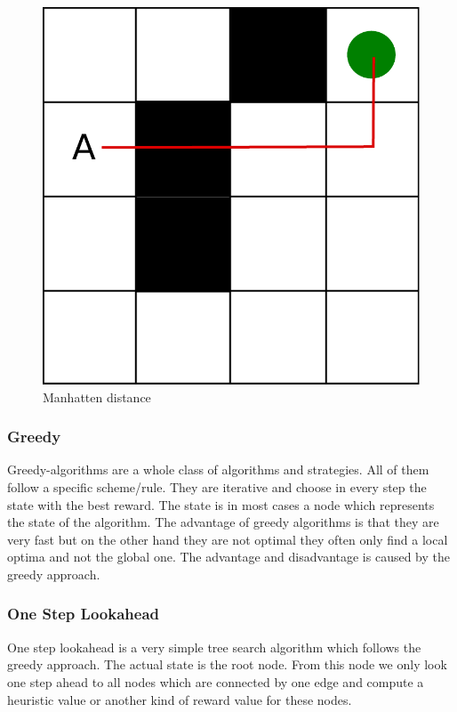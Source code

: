 \begin{figure}
\centering
\includegraphics[scale=0.3]{images/manhatten.pdf}
\caption{Manhatten distance}
\label{fig:manhatten}
\end{figure}



\subsubsection{Greedy}

Greedy-algorithms are a whole class of algorithms and strategies. All of them follow a specific scheme/rule. They are iterative and choose in every step the state with the best reward. The state is in most cases a node which represents the state of the algorithm. The advantage of greedy algorithms is that they are very fast but on the other hand they are not optimal they often only find a local optima and not the global one. The advantage and disadvantage is caused by the greedy approach.  

\subsubsection{One Step Lookahead}

One step lookahead is a very simple tree search algorithm which follows the greedy approach. The actual state is the root node. From this node we only look one step ahead to all nodes which are connected by one edge and compute a heuristic value or another kind of reward value for these nodes. 

